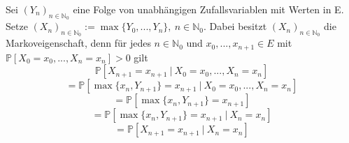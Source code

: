 Sei $(Y_{n})_{n \in \mathbb{N}_{0}}$ eine Folge von unabhängigen Zufallsvariablen mit Werten in E. Setze $(X_{n})_{n \in \mathbb{N}_{0}} := \max \lbrace Y_{0},...,Y_{n} \rbrace, \: n \in \mathbb{N}_{0}$. Dabei besitzt $(X_{n})_{n \in \mathbb{N}_{0}}$ die Markoveigenschaft, denn für jedes $n \in \mathbb{N}_{0}$ und $x_{0},...,x_{n+1} \in E$ mit $\mathbb{P}[X_{0} = x_{0},...,X_{n} = x_{n}]>0$ gilt 
\begin{equation*}
\mathbb{P}[X_{n+1} = x_{n+1} \: | \: X_{0} = x_{0},...,X_{n} = x_{n}]  
\end{equation*}
\begin{equation*}
= \mathbb{P}[\max\lbrace x_{n}, Y_{n+1} \rbrace = x_{n+1} \: | \: X_{0} = x_{0},...,X_{n} = x_{n}]
\end{equation*}
\begin{equation*}
= \mathbb{P}[\max\lbrace x_{n}, Y_{n+1} \rbrace 
= x_{n+1}] 
\end{equation*}
\begin{equation*}
= \mathbb{P}[\max\lbrace x_{n}, Y_{n+1} \rbrace = x_{n+1} \: | \: X_{n} = x_{n}] 
\end{equation*}
\begin{equation*}
= \mathbb{P}[X_{n+1} = x_{n+1} \: | \: X_{n} = x_{n}]
\end{equation*}